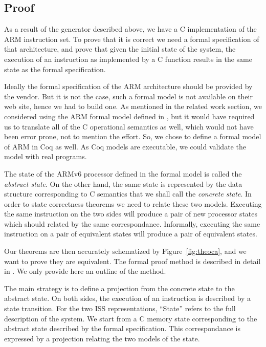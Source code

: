 \documentclass[a4paper, conference]{IEEEtran}
\begin{document}
\subsection{Proof}

As a result of the generator described above, we have a C
implementation of the ARM instruction set.  To prove that it is correct
we need a formal specification of that architecture, and prove that
given the initial state of the system, the execution of an instruction
as implemented by a C function results in the same state as the formal
specification.

Ideally the formal specification of the ARM architecture should be
provided by the vendor. But it is not the case, such a formal model is
not available on their web site, hence we had to build one.  As
mentioned in the related work section, we considered using the ARM
formal model defined in \cite{FoxM10}, but it would have required
us to translate all of the C operational semantics as well, which
would not have been error prone, not to mention the effort. So, we
chose to define a formal model of ARM in Coq as well. As Coq models
are executable, we could validate the model with real programs.

The state of the ARMv6 processor defined in the formal model is called
the \emph{abstract state}.  On the other hand, the same state is
represented by the data structure corresponding to C semantics that we
shall call the \emph{concrete state}.  In order to state correctness
theorems we need to relate these two models.  Executing the same
instruction on the two sides will produce a pair of new processor
states which should related by the same correspondance. Informally,
executing the same instruction on a pair of equivalent states will
produce a pair of equivalent states.

Our theorems are then accurately schematized by
Figure~\ref{fig:theoca}, and we want to prove they are equivalent.
The formal proof method is described in detail in
\cite{xiaomu-phd}. We only provide here an outline of the method.

The main strategy is to define a projection from the concrete state to
the abstract state.  On both sides, the execution of an instruction is
described by a state transition.  For the two ISS representations,
``State'' refers to the full description of the system.  We start from
a C memory state corresponding to the abstract state described by
the formal specification.  This correspondance is expressed by a
projection relating the two models of the state.
\end{document}
